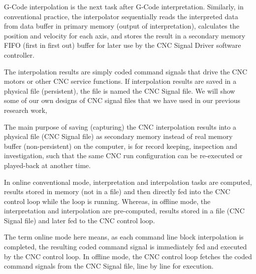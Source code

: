 G-Code interpolation is the next task after G-Code interpretation. Similarly, in conventional practice, the interpolator sequentially reads the interpreted data from data buffer in primary memory (output of interpretation), calculates the position and velocity for each axis, and stores the result in a secondary memory FIFO (first in first out) buffer for later use by the CNC Signal Driver software controller. 
\vspace*{1\baselineskip}

The interpolation results are simply coded command signals that drive the CNC motors or other CNC service functions. If  interpolation results are saved in a physical file (persistent), the file is named the CNC Signal file. We will show some of our own designs of CNC signal files that we have used in our previous research work,

\begin{tcolorbox}[colback=green!15!white,colframe=red!75!black,title=Research consideration no. 1]
\justifying
The main purpose of saving (capturing) the CNC interpolation results into a physical file (CNC Signal file) as secondary memory instead of real memory buffer (non-persistent) on the computer, is for record keeping, inspection and investigation, such that the same CNC run configuration can be re-executed or played-back at another time. 
\end{tcolorbox}

In online conventional mode, interpretation and interpolation tasks are computed, results stored in memory (not in a file) and then directly fed into the CNC control loop while the loop is running. Whereas, in offline mode, the interpretation and interpolation are pre-computed, results stored in a file (CNC Signal file) and later fed to the CNC control loop.
\vspace*{1\baselineskip}

The term online mode here means, as each command line block interpolation is completed, the resulting coded command signal is immediately fed and executed by the CNC control loop. In offline mode, the CNC control loop fetches the coded command signals from the CNC Signal file, line by line for execution.  

